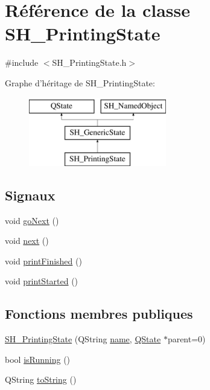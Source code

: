 \hypertarget{classSH__PrintingState}{\section{Référence de la classe S\-H\-\_\-\-Printing\-State}
\label{classSH__PrintingState}
}


{\ttfamily \#include $<$S\-H\-\_\-\-Printing\-State.\-h$>$}

Graphe d'héritage de S\-H\-\_\-\-Printing\-State\-:\begin{figure}[H]
\begin{center}
\leavevmode
\includegraphics[height=3.000000cm]{classSH__PrintingState}
\end{center}
\end{figure}
\subsection*{Signaux}
\begin{DoxyCompactItemize}
\item 
void \hyperlink{classSH__GenericState_a34c1bebc765cc3a62d66c94c37d4f0c3}{go\-Next} ()
\item 
void \hyperlink{classSH__GenericState_ad5e2a1f3dc129336c8f529cf897c2eb0}{next} ()
\item 
void \hyperlink{classSH__PrintingState_a2d3819c50a51e825ca27b2d320af4828}{print\-Finished} ()
\item 
void \hyperlink{classSH__PrintingState_a59679f51ced1c4a956e752999526d7fe}{print\-Started} ()
\end{DoxyCompactItemize}
\subsection*{Fonctions membres publiques}
\begin{DoxyCompactItemize}
\item 
\hyperlink{classSH__PrintingState_a7de0648d781bf21f03769d975fff0c38}{S\-H\-\_\-\-Printing\-State} (Q\-String \hyperlink{classSH__NamedObject_a9f686c6f2a5bcc08ad03d0cee0151f0f}{name}, \hyperlink{classQState}{Q\-State} $\ast$parent=0)
\item 
bool \hyperlink{classSH__GenericState_a5f731810dad0cacd28828ccbf1539e4e}{is\-Running} ()
\item 
Q\-String \hyperlink{classSH__GenericState_a7779babbb40f3f8faa71112204d9804f}{to\-String} ()
\end{DoxyCompactItemize}
